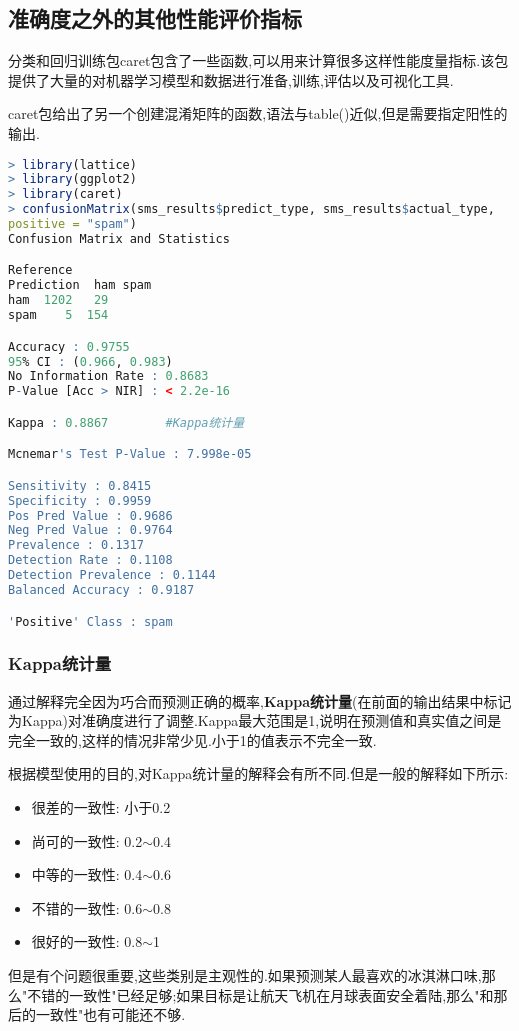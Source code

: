 \documentclass[11pt,a4paper,oneside]{book}
\begin{document}
\subsection{准确度之外的其他性能评价指标}
分类和回归训练包caret包含了一些函数,可以用来计算很多这样性能度量指标.该包提供了大量的对机器学习模型和数据进行准备,训练,评估以及可视化工具.

caret包给出了另一个创建混淆矩阵的函数,语法与table()近似,但是需要指定阳性的输出.

\begin{lstlisting}[language=r]
> library(lattice)
> library(ggplot2)
> library(caret)
> confusionMatrix(sms_results$predict_type, sms_results$actual_type, 
positive = "spam")
Confusion Matrix and Statistics

Reference
Prediction  ham spam
ham  1202   29
spam    5  154

Accuracy : 0.9755        
95% CI : (0.966, 0.983)
No Information Rate : 0.8683        
P-Value [Acc > NIR] : < 2.2e-16     

Kappa : 0.8867        #Kappa统计量

Mcnemar's Test P-Value : 7.998e-05     

Sensitivity : 0.8415        
Specificity : 0.9959        
Pos Pred Value : 0.9686        
Neg Pred Value : 0.9764        
Prevalence : 0.1317        
Detection Rate : 0.1108        
Detection Prevalence : 0.1144        
Balanced Accuracy : 0.9187        

'Positive' Class : spam   
\end{lstlisting}

\subsubsection{Kappa统计量}
通过解释完全因为巧合而预测正确的概率,\textbf{Kappa统计量}(在前面的输出结果中标记为Kappa)对准确度进行了调整.Kappa最大范围是1,说明在预测值和真实值之间是完全一致的,这样的情况非常少见.小于1的值表示不完全一致.

根据模型使用的目的,对Kappa统计量的解释会有所不同.但是一般的解释如下所示:
\begin{itemize}
	\item 很差的一致性: 小于0.2
	\item 尚可的一致性: 0.2$ \sim $0.4
	\item 中等的一致性: 0.4$ \sim $0.6
	\item 不错的一致性: 0.6$ \sim $0.8
	\item 很好的一致性: 0.8$ \sim $1
\end{itemize}
但是有个问题很重要,这些类别是主观性的.如果预测某人最喜欢的冰淇淋口味,那么"不错的一致性"已经足够;如果目标是让航天飞机在月球表面安全着陆,那么"和那后的一致性"也有可能还不够.
\end{document}
